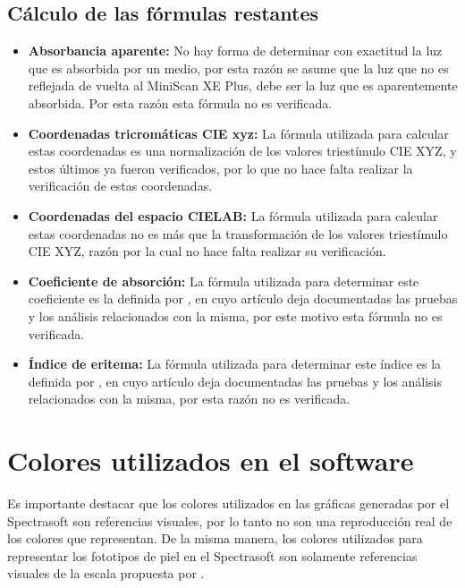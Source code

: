 \subsection{C\'{a}lculo de las f\'{o}rmulas restantes}

	\begin{itemize}
		
		\item \textbf{Absorbancia aparente:} No hay forma de determinar con exactitud la luz que es absorbida por un medio, por esta raz\'{o}n se asume que la luz que no es reflejada de vuelta al MiniScan XE Plus, debe ser la luz que es aparentemente absorbida. Por esta raz\'{o}n esta f\'{o}rmula no es verificada.
	
		\item \textbf{Coordenadas tricrom\'{a}ticas CIE xyz:} La f\'{o}rmula utilizada para calcular estas coordenadas es una normalizaci\'{o}n de los valores triest\'{i}mulo CIE XYZ, y estos \'{u}ltimos ya fueron verificados, por lo que no hace falta realizar la verificaci\'{o}n de estas coordenadas.
		
		\item \textbf{Coordenadas del espacio CIELAB:} La f\'{o}rmula utilizada para calcular estas coordenadas no es m\'{a}s que la transformaci\'{o}n de los valores triest\'{i}mulo CIE XYZ, raz\'{o}n por la cual no hace falta realizar su verificaci\'{o}n.
		
		\item \textbf{Coeficiente de absorci\'{o}n:} La f\'{o}rmula utilizada para determinar este coeficiente es la definida por \cite{Narea}, en cuyo art\'{i}culo deja documentadas las pruebas y los an\'{a}lisis relacionados con la misma, por este motivo esta f\'{o}rmula no es verificada.
		
		\item \textbf{\'{I}ndice de eritema:} La f\'{o}rmula utilizada para determinar este \'{i}ndice es la definida por \cite{Wagner}, en cuyo art\'{i}culo deja documentadas las pruebas y los an\'{a}lisis relacionados con la misma, por esta raz\'{o}n no es verificada.
	\end{itemize}
	
\section{Colores utilizados en el software}

	Es importante destacar que los colores utilizados en las gr\'{a}ficas generadas por el Spectrasoft son referencias visuales, por lo tanto no son una reproducci\'{o}n real de los colores que representan. De la misma manera, los colores utilizados para representar los fototipos de piel en el Spectrasoft son solamente referencias visuales de la escala propuesta por \cite{Fitzpatrick}.